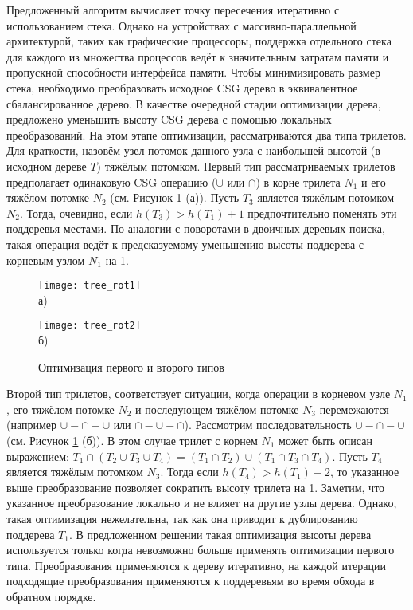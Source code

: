 Предложенный алгоритм вычисляет точку пересечения итеративно с использованием стека. Однако на устройствах  с массивно-параллельной архитектурой, таких как графические процессоры, поддержка отдельного стека для каждого из множества процессов ведёт к значительным затратам памяти и пропускной способности интерфейса памяти. Чтобы минимизировать размер стека, необходимо преобразовать исходное CSG дерево в эквивалентное сбалансированное дерево. В качестве очередной стадии оптимизации дерева, предложено уменьшить высоту CSG дерева с помощью локальных преобразований. На этом этапе оптимизации, рассматриваются два типа трилетов. Для краткости, назовём узел-потомок данного узла с наибольшей высотой (в исходном дереве $T$) тяжёлым потомком. Первый тип рассматриваемых трилетов предполагает одинаковую CSG операцию ($\cup$ или $\cap$) в корне трилета $N_1$ и его тяжёлом потомке $N_2$ (см. Рисунок \ref{fig:tree_rotations} (а)). Пусть $T_3$ является тяжёлым потомком $N_2$. Тогда, очевидно, если $h(T_3) > h(T_1) + 1$ предпочтительно поменять эти поддеревья местами. По аналогии с поворотами в двоичных деревьях поиска, такая операция ведёт к предсказуемому уменьшению высоты поддерева с корневым узлом $N_1$ на 1.

\begin{figure}[ht]
  \begin{minipage}[ht]{0.49\linewidth}\centering
    \texttt{[image: tree\_rot1]} \\ а)
  \end{minipage}
  \hfill
  \begin{minipage}[ht]{0.49\linewidth}\centering
    \texttt{[image: tree\_rot2]} \\ б)
  \end{minipage}
  \caption{Оптимизация первого и второго типов}
  \label{fig:tree_rotations}  
\end{figure}

Второй тип трилетов, соответствует ситуации, когда операции в корневом узле $N_1$, его тяжёлом потомке $N_2$ и последующем тяжёлом потомке $N_3$ перемежаются (например $\cup-\cap-\cup$ или $\cap-\cup-\cap$). Рассмотрим последовательность $\cup-\cap-\cup$ (см. Рисунок \ref{fig:tree_rotations} (б)). В этом случае трилет с корнем $N_1$ может быть описан выражением: $T_1 \cap (T_2 \cup T_3 \cup T_4) = (T_1 \cap T_2) \cup (T_1 \cap T_3 \cap T_4)$. Пусть $T_4$ является тяжёлым потомком $N_3$. Тогда если $h(T_4) > h(T_1) + 2$, то указанное выше преобразование позволяет сократить высоту трилета на 1. Заметим, что указанное преобразование локально и не влияет на другие узлы дерева. Однако, такая оптимизация нежелательна, так как она приводит к дублированию поддерева $T_1$. В предложенном решении такая оптимизация высоты дерева используется только когда невозможно больше применять оптимизации первого типа. Преобразования применяются к дереву итеративно, на каждой итерации подходящие преобразования применяются к поддеревьям во время обхода в обратном порядке.

